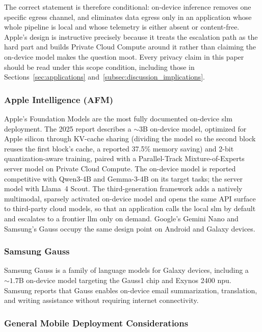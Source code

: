 The correct statement is therefore conditional: on-device inference removes one
specific egress channel, and eliminates data egress only in an application whose
whole pipeline is local and whose telemetry is either absent or content-free.
Apple's design \citep{gunter2025afm} is instructive precisely because it treats
the escalation path as the hard part and builds Private Cloud Compute around it
rather than claiming the on-device model makes the question moot. Every privacy
claim in this paper should be read under this scope condition, including those in
Sections~\ref{sec:applications} and~\ref{subsec:discussion_implications}.

\subsubsection{Apple Intelligence (AFM)}

Apple's Foundation Models \citep{apple2024intelligence,gunter2025afm} are the most fully documented on-device \gls{slm} deployment. The 2025 report \citep{gunter2025afm} describes a $\sim$3B on-device model, optimized for Apple silicon through KV-cache sharing (dividing the model so the second block reuses the first block's cache, a reported 37.5\% memory saving) and 2-bit quantization-aware training, paired with a Parallel-Track Mixture-of-Experts server model on Private Cloud Compute. The on-device model is reported competitive with Qwen3-4B and Gemma-3-4B on its target tasks; the server model with Llama~4 Scout. The third-generation framework \citep{apple2026afm3} adds a natively multimodal, sparsely activated on-device model and opens the same API surface to third-party cloud models, so that an application calls the local \gls{slm} by default and escalates to a frontier \gls{llm} only on demand. Google's Gemini Nano and Samsung's Gauss \citep{samsung2023gauss} occupy the same design point on Android and Galaxy devices.

\subsubsection{Samsung Gauss}

Samsung Gauss \citep{samsung2023gauss} is a family of language models for Galaxy devices, including a ${\sim}1.7$B on-device model targeting the Gauss1 chip and Exynos 2400 \gls{npu}. Samsung reports that Gauss enables on-device email summarization, translation, and writing assistance without requiring internet connectivity.

\subsubsection{General Mobile Deployment Considerations}

